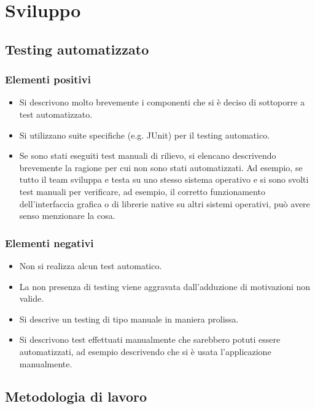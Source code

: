 \documentclass[a4paper,12pt]{report}
\begin{document}
\chapter{Sviluppo}
\section{Testing automatizzato}

\subsection*{Elementi positivi}

\begin{itemize}
 \item Si descrivono molto brevemente i componenti che si è deciso di sottoporre a test automatizzato.
 \item Si utilizzano suite specifiche (e.g. JUnit) per il testing automatico.
 \item Se sono stati eseguiti test manuali di rilievo, si elencano descrivendo brevemente la ragione per cui non sono stati automatizzati. Ad esempio, se tutto il team sviluppa e testa su uno stesso sistema operativo e si sono svolti test manuali per verificare, ad esempio, il corretto funzionamento dell'interfaccia grafica o di librerie native su altri sistemi operativi, può avere senso menzionare la cosa.
\end{itemize}

\subsection*{Elementi negativi}
\begin{itemize}
 \item Non si realizza alcun test automatico.
 \item La non presenza di testing viene aggravata dall'adduzione di motivazioni non valide.
 \item Si descrive un testing di tipo manuale in maniera prolissa.
 \item Si descrivono test effettuati manualmente che sarebbero potuti essere automatizzati, ad esempio descrivendo che si è usata l'applicazione manualmente.
\end{itemize}

\section{Metodologia di lavoro}
\end{document}
